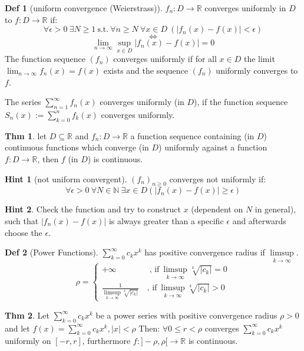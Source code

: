 \documentclass[a4paper, 10pt]{article}
\theoremstyle{definition}
\newtheorem*{theorem}{Thm}
\newtheorem*{definition}{Def}
\newtheorem*{note_wrapper}{Hint}
\theoremstyle{named}
\newenvironment{note}%
    {\begin{mdframed}[style=trick]\begin{note_wrapper}}%
    {\end{note_wrapper}\end{mdframed}}
\newcommand{\R}{\mathbb{R}}
\newcommand{\N}{\mathbb{N}}
\begin{document}
\begin{definition}[uniform convergence (Weierstrass)]
    $f_n: D \to \R$ converges uniformly in $D$ to $f: D \to \R$ if: 
    $$\forall \epsilon > 0 \ \exists N \geq 1 \ \text{s.t.} \ \forall n \geq N \ \forall x \in D \ (|f_n(x) - f(x)| < \epsilon)$$
    $$\iff$$
    $$\lim_{n\to\infty} \sup_{x \in D} |f_n(x) - f(x)| = 0$$
    The function sequence $(f_n)$ converges uniformly if for all $x \in D$ the limit $\lim_{n\to\infty} f_n(x) = f(x)$ exists and the sequence $(f_n)$ uniformly converges to $f$.

    The series $\sum_{n = 1}^\infty f_n(x)$ converges uniformly (in $D$), if the function sequence $S_n(x) := \sum_{k=0}^n f_k(x)$ converges uniformly.
\end{definition}

\begin{theorem}
    let $D \subseteq \R$ and $f_n: D \to \R$ a function sequence containing (in $D$) continuous functions which converge (in $D$) uniformly against a function $f: D \to \R$, then $f$ (in $D$) is continuous.
\end{theorem}

\begin{note}[not uniform convergent] $(f_n)_{n \geq 0}$ converges not uniformly if:
    $$\forall \epsilon > 0 \ \forall N \in \N \ \exists x \in D (|f_n(x) - f(x)| \geq \epsilon)$$
\end{note}

\begin{note}
    Check the function and try to construct $x$ (dependent on $N$ in general), such that $|f_n(x) - f(x)|$ is always greater than a specific $\epsilon$ and afterwards choose the $\epsilon$.
\end{note}

\begin{definition}[Power Functions]
    $\sum_{k = 0}^\infty c_k x^k$ has positive convergence radius if $\underset{k \to \infty}{\limsup}$.
    $$\rho = \begin{cases}
        + \infty \quad \quad \quad \quad \text{, if} \ \underset{k \to \infty}{\limsup} \sqrt[k]{|c_k|} = 0 \\
        \frac{1}{\underset{k \to \infty}{\limsup} \sqrt[k]{|c_k|}} \quad \text{, if} \ \underset{k \to \infty}{\limsup} \sqrt[k]{|c_k|} > 0
    \end{cases}$$
\end{definition}

\begin{theorem}
    Let $\sum_{k=0}^\infty c_kx^k$ be a power series with positive convergence radius $\rho > 0$ and let $f(x) = \sum_{k=0}^\infty c_kx^k, |x| < \rho$ Then: $\forall 0 \leq r < \rho$ converges $\sum_{k=0}^\infty c_kx^k$ uniformly on $[-r,r]$, furthermore  $f: ]-\rho, \rho[ \to \mathbb{R}$ is continuous.
\end{theorem}
\end{document}
